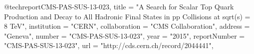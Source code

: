 @techreport{CMS-PAS-SUS-13-023,
      title         = "{A Search for Scalar Top Quark Production and Decay to All
                       Hadronic Final States in pp Collisions at sqrt(s) = 8 TeV}",
      institution   = "CERN",
      collaboration = "CMS Collaboration",
      address       = "Geneva",
      number        = "CMS-PAS-SUS-13-023",
      year          = "2015",
      reportNumber  = "CMS-PAS-SUS-13-023",
      url           = "http://cds.cern.ch/record/2044441",
}

